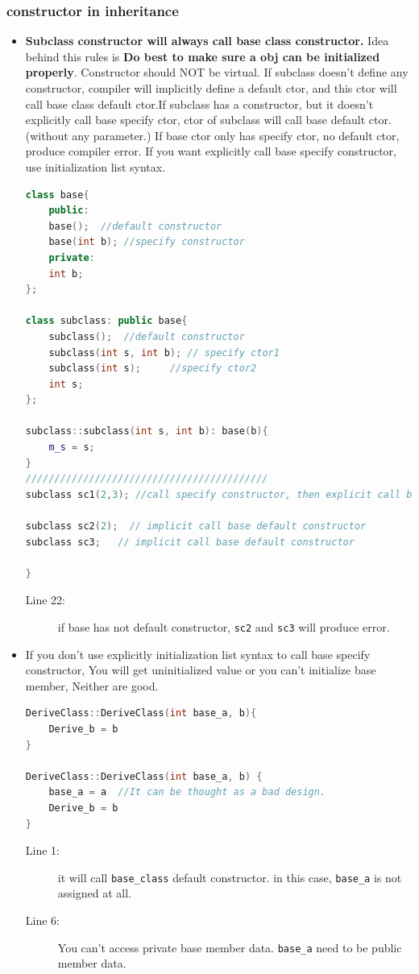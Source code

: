 \documentclass[a4paper,11pt,twoside]{book}
\begin{document}
\subsubsection{constructor in inheritance}
\begin{itemize}
	\item  \textbf{Subclass constructor will always call base class constructor.} Idea behind this rules is \textbf{Do best to make sure a obj can be initialized properly}. Constructor should NOT be virtual. If subclass doesn't define any constructor, compiler will implicitly define a default ctor, and this ctor will call base class default ctor.If subclass has a constructor, but it doesn't explicitly call base specify ctor, ctor of subclass will call base default ctor.(without any parameter.) If base ctor only has specify ctor, no default ctor, produce compiler error. If you want explicitly call base specify constructor, use initialization list syntax.	
\begin{lstlisting}[frame=single, language=c++]
class base{
	public:
	base();  //default constructor
	base(int b); //specify constructor
	private:
	int b;
};
	
class subclass: public base{
	subclass();  //default constructor
	subclass(int s, int b); // specify ctor1
	subclass(int s);     //specify ctor2
	int s;
};
	
subclass::subclass(int s, int b): base(b){
	m_s = s;
}
//////////////////////////////////////////
subclass sc1(2,3); //call specify constructor, then explicit call base specify constructor.

subclass sc2(2);  // implicit call base default constructor
subclass sc3;   // implicit call base default constructor

}
\end{lstlisting}
\begin{description}
	\item[Line 22:] if base has not default constructor, \texttt{sc2} and \texttt{sc3} will produce error.
\end{description}

	\item If you don't use  explicitly initialization list syntax to call base specify constructor, You will get uninitialized value or you can't initialize base member, Neither are good.
\begin{lstlisting}[frame=single, language=c++]
DeriveClass::DeriveClass(int base_a, b){
	Derive_b = b
}	

DeriveClass::DeriveClass(int base_a, b) {
	base_a = a  //It can be thought as a bad design.
	Derive_b = b
}
\end{lstlisting}
\begin{description}
	\item[Line 1:] it will call \texttt{base\_class} default constructor. in this case, \texttt{base\_a} is not assigned at all.
	\item[Line 6:] You can't  access private base member data. \texttt{base\_a} need to be public member data.
\end{description}

\end{itemize}
\end{document}
